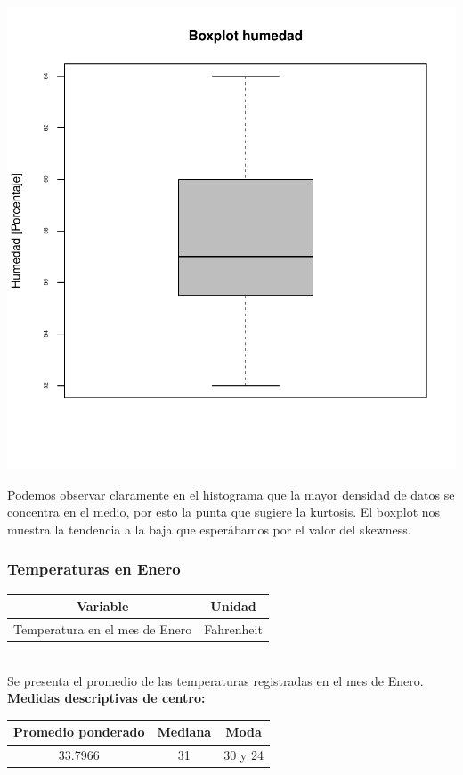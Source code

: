\documentclass[11pt]{article}
\begin{document}
\begin{center}
    \includegraphics[scale = 0.3]{boxhu}
\end{center}

Podemos observar claramente en el histograma que la mayor densidad de datos se concentra en el medio, por esto la punta que sugiere la kurtosis. El boxplot nos muestra la tendencia a la baja que esperábamos por el valor del skewness.

\subsubsection{Temperaturas en Enero}

\begin{center}
\begin{tabular}{|c|c|}
    \hline
    Variable & Unidad  \\ \hline
    Temperatura en el mes de Enero & Fahrenheit \\
    \hline
\end{tabular}
\end{center}
\\
Se presenta el promedio de las temperaturas registradas en el mes de Enero.
\\

\textbf{Medidas descriptivas de centro:}

\begin{center}
\begin{tabular}{|c|c|c|}
    \hline
    Promedio ponderado & Mediana & Moda \\ \hline
    33.7966  & 31 & 30 y 24 \\
    \hline
\end{tabular}
\end{center}
\end{document}
